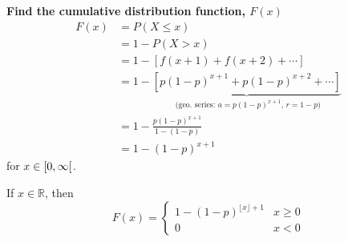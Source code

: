 \textbf{Find the cumulative distribution function, $ F(x)$}
\begin{align*}
    F(x) & =P(X\le x)                                                     \\
         & =1-P(X>x)                                                      \\
         & =1-\left[f(x+1)+f(x+2)+\cdots\right]                           \\
         & =1-\underbrace{\left[p(1-p)^{x+1}+p(1-p)^{x+2}+\cdots\right]}_
    \text{ (geo.\ series: $a=p(1-p)^{x+1}$, $r=1-p$)}                     \\
         & =1-\frac{p(1-p)^{x+1}}{1-(1-p)}                                \\
         & =1-(1-p)^{x+1}
\end{align*}
for $ x\in\rinterval{0}{\infty} $.

If $ x\in\mathbb{R} $, then
\[ F(x)=
    \left\{\begin{array}{cc}
        1-(1-p)^{\lfloor x \rfloor +1} & x\ge 0 \\
        0                              & x < 0
    \end{array}\right.
\]
